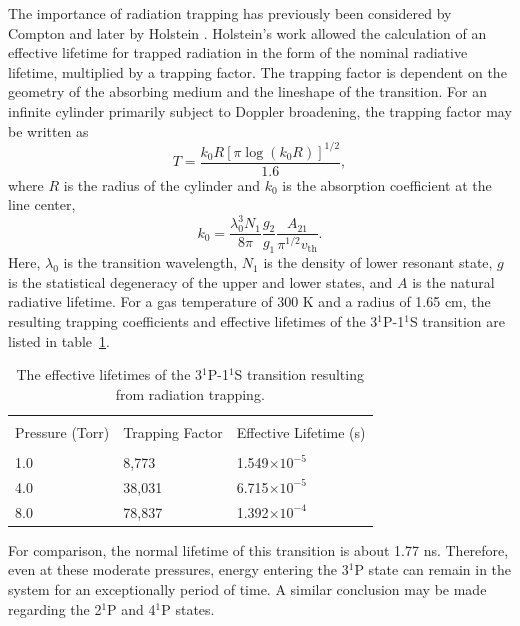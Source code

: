 The importance of radiation trapping has previously been considered by Compton
\cite{Compton1922} and later by Holstein \cite{Holstein1947, Holstein1951}.
Holstein's work allowed the calculation of an effective lifetime for trapped
radiation in the form of the nominal radiative lifetime, multiplied by a
trapping factor. The trapping factor is dependent on the geometry of the
absorbing medium and the lineshape of the transition. For an infinite cylinder
primarily subject to Doppler broadening, the trapping factor may be written as
\begin{equation}
  T = \frac{k_0R\left[\pi\log(k_0R)\right]^{1/2}}{1.6},
\end{equation}
where $R$ is the radius of the cylinder and $k_0$ is the absorption coefficient
at the line center,
\begin{equation}
  k_0 = \frac{\lambda_0^3N_1}{8\pi} \frac{g_2}{g_1}
        \frac{A_{21}}{\pi^{1/2}v_\mathrm{th}}.
\end{equation}
Here, $\lambda_0$ is the transition wavelength, $N_1$ is the density of lower
resonant state, $g$ is the statistical degeneracy of the upper and lower states,
and $A$ is the natural radiative lifetime. For a gas temperature of 300 K and a
radius of 1.65 cm, the resulting trapping coefficients and effective lifetimes
of the 3$^1$P-1$^1$S transition are listed in table~\ref{tbl:lifetimes}.
\begin{table}
  \centering
  \caption{The effective lifetimes of the 3$^1$P-1$^1$S transition resulting
    from radiation trapping.}
  \label{tbl:lifetimes}
  \begin{tabular}{lll}
    \toprule \\
    Pressure (Torr) & Trapping Factor & Effective Lifetime (s) \\
    \midrule \\
    1.0             & 8,773            & 1.549$\times10^{-5}$   \\
    4.0             & 38,031           & 6.715$\times10^{-5}$   \\
    8.0             & 78,837           & 1.392$\times10^{-4}$   \\
    \bottomrule
  \end{tabular}
\end{table}
For comparison, the normal lifetime of this transition is about 1.77 ns.
Therefore, even at these moderate pressures, energy entering the 3$^1$P state
can remain in the system for an exceptionally period of time. A similar
conclusion may be made regarding the 2$^1$P and 4$^1$P states. 

